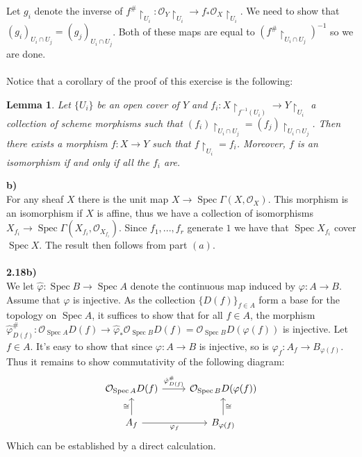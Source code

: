 \documentclass[12pt]{article}
\numberwithin{thm}{subsection}
\numberwithin{defn}{subsection}
\newtheorem{lemma}{Lemma}
\numberwithin{lemma}{subsection}
\numberwithin{example}{subsection}
\numberwithin{notation}{subsection}
\numberwithin{cor}{subsection}
\numberwithin{remark}{subsection}
\numberwithin{condition}{subsection}
\numberwithin{question}{subsection}
\numberwithin{construction}{subsection}
\numberwithin{construction}{subsection}
\numberwithin{construction}{subsection}
\newcommand{\call}[1]{\mathcal{#1}}
\newcommand{\lto}{\longrightarrow}
\begin{document}
Let $g_i$ denote the inverse of $f^{\#}\restriction_{U_i}: \call{O}_Y\restriction_{U_i} \lto f_\ast\call{O}_X\restriction_{U_i}$. We need to show that $(g_i)_{U_i \cap U_j} = (g_j)_{U_i \cap U_j}$. Both of these maps are equal to $(f^{\#}\restriction_{U_i \cap U_j})^{-1}$ so we are done.\\\\
%
Notice that a corollary of the proof of this exercise is the following:
\begin{lemma}
Let $\lbrace U_i \rbrace$ be an open cover of $Y$ and $f_i: X\restriction_{f^{-1}(U_i)} \to Y\restriction_{U_i}$ a collection of scheme morphisms such that $(f_i)\restriction_{U_i \cap U_j} = (f_j)\restriction_{U_i \cap U_j}$. Then there exists a morphism $f: X \to Y$ such that $f\restriction_{U_i} = f_i$. Moreover, $f$ is an isomorphism if and only if all the $f_i$ are.
\end{lemma}
\textbf{b)}\\
For any sheaf $X$ there is the unit map $X \lto \operatorname{Spec}\Gamma(X,\call{O}_X)$. This morphism is an isomorphism if $X$ is affine, thus we have a collection of isomorphisms $X_{f_i} \lto \operatorname{Spec}\Gamma(X_{f_i},\call{O}_{X_{f_i}})$. Since $f_1,...,f_r$ generate $1$ we have that $\operatorname{Spec}X_{f_i}$ cover $\operatorname{Spec}X$. The result then follows from part $(a)$.
\\\\
\textbf{2.18b)}\\
We let $\hat{\varphi}: \operatorname{Spec}B \lto \operatorname{Spec}A$ denote the continuous map induced by $\varphi:A \lto B$. Assume that $\varphi$ is injective. As the collection $\lbrace D(f)\rbrace_{f \in A}$ form a base for the topology on $\operatorname{Spec}A$, it suffices to show that for all $f\in A$, the morphism $\hat{\varphi}^{\#}_{D(f)}: \call{O}_{\operatorname{Spec}A}D(f) \lto \hat{\varphi}_\ast\call{O}_{\operatorname{Spec}B}D(f) = \call{O}_{\operatorname{Spec}B}D(\varphi(f))$ is injective. Let $f\in A$. It's easy to show that since $\varphi:A \lto B$ is injective, so is $\varphi_f: A_f \lto B_{\varphi(f)}$. Thus it remains to show commutativity of the following diagram:
\[
\begin{tikzcd}
\call{O}_{\operatorname{Spec}A}D(f)\arrow[r,"{\hat{\varphi}^{\#}_{D(f)}}"] & \call{O}_{\operatorname{Spec}B}D(\varphi(f))\\
A_f\arrow[r,swap,"{\varphi_f}"]\arrow[u,"{\cong}"] & B_{\varphi(f)}\arrow[u,swap,"{\cong}"]
\end{tikzcd}
\]
Which can be established by a direct calculation.
%
\end{document}
